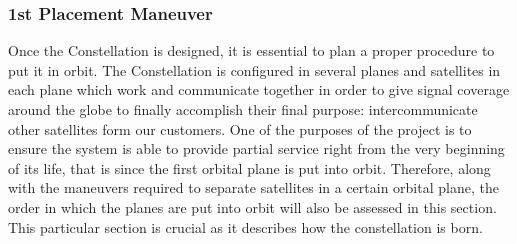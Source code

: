 \subsubsection{1st Placement Maneuver}
Once the Constellation is designed, it is essential to plan a proper procedure to put it in orbit. The Constellation is configured in several planes and satellites in each plane which work and communicate together in order to give signal coverage around the globe to finally accomplish their final purpose: intercommunicate other satellites form our customers.
\newline\newline
One of the purposes of the project is to ensure the system is able to provide partial service right from the very beginning of its life, that is since the first orbital plane is put into orbit. Therefore, along with the maneuvers required to separate satellites in a certain orbital plane, the order in which the planes are put into orbit will also be assessed in this section. This particular section is crucial as it describes how the constellation is born.
